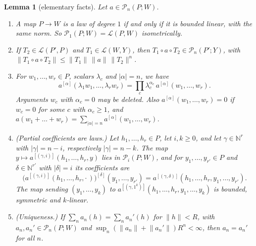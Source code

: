 \documentclass[11pt]{amsart}
\newtheorem{lemma}[theorem]{Lemma}
\theoremstyle{definition}
\theoremstyle{remark}
\numberwithin{equation}{section}
\newcommand{\N}{\mathbb N}
\newcommand{\cL}{\mathcal L}
\newcommand{\abs}[1]{\lvert #1\rvert}
\newcommand{\norm}[1]{\lVert #1\rVert}
\theoremstyle{plain}
\theoremstyle{definition}
\theoremstyle{plain}
\newcommand{\cP}{\mathcal P}
\begin{document}
\begin{lemma}[elementary facts]\label{dp:lem:elementary}
Let $a\in\cP_n(P;W)$.
\begin{enumerate}
\item A map $P\to W$ is a law of degree $1$ if and only if it is bounded linear, with the same norm. So $\cP_1(P;W)=\cL(P,W)$ isometrically.
\item If $T_2\in\cL(P',P)$ and $T_1\in\cL(W,Y)$, then $T_1\circ a\circ T_2\in\cP_n(P';Y)$, with $\norm{T_1\circ a\circ T_2}\le\norm{T_1}\,\norm a\,\norm{T_2}^n$.
\item For $w_1,\dots,w_r\in P$, scalars $\lambda_c$ and $\abs\alpha=n$, we have
\[
 a^{[\alpha]}(\lambda_1w_1,\dots,\lambda_rw_r)=\prod_c\lambda_c^{\alpha_c}\,a^{[\alpha]}(w_1,\dots,w_r).
\]
Arguments $w_c$ with $\alpha_c=0$ may be deleted. Also $a^{[\alpha]}(w_1,\dots,w_r)=0$ if $w_c=0$ for some $c$ with $\alpha_c\ge1$, and $a(w_1+\dots+w_r)=\sum_{\abs\alpha=n}a^{[\alpha]}(w_1,\dots,w_r)$.
\item (Partial coefficients are laws.) Let $h_1,\dots,h_r\in P$, let $i,k\ge0$, and let $\gamma\in\N^r$ with $\abs\gamma=n-i$, respectively $\abs\gamma=n-k$. The map $y\mapsto a^{[(\gamma,i)]}(h_1,\dots,h_r,y)$ lies in $\cP_i(P;W)$, and for $y_1,\dots,y_{r'}\in P$ and $\delta\in\N^{r'}$ with $\abs\delta=i$ its coefficients are
\begin{equation}\label{dp:laws:partial}
 \bigl(a^{[(\gamma,i)]}(h_1,\dots,h_r,\cdot\,)\bigr)^{[\delta]}(y_1,\dots,y_{r'})=a^{[(\gamma,\delta)]}(h_1,\dots,h_r,y_1,\dots,y_{r'}).
\end{equation}
The map sending $(y_1,\dots,y_k)$ to $a^{[(\gamma,1^k)]}(h_1,\dots,h_r,y_1,\dots,y_k)$ is bounded, symmetric and $k$\nobreakdash-linear.
\item (Uniqueness.) If $\sum_na_n(h)=\sum_na_n'(h)$ for $\norm h<R$, with $a_n,a_n'\in\cP_n(P;W)$ and $\sup_n(\norm{a_n}+\norm{a_n'})R^n<\infty$, then $a_n=a_n'$ for all $n$.
\end{enumerate}
\end{lemma}
\end{document}
